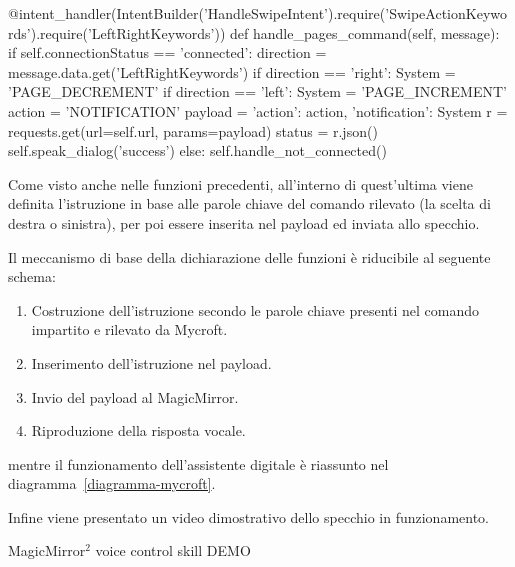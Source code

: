 \documentclass[12pt,a4paper]{article}
\begin{document}
\begin{MyVerbatim}
@intent_handler(IntentBuilder('HandleSwipeIntent').require('SwipeActionKeywords').require('LeftRightKeywords'))
def handle_pages_command(self, message):
    if self.connectionStatus == 'connected':
        direction = message.data.get('LeftRightKeywords')
        if direction == 'right':
            System = 'PAGE_DECREMENT'
        if direction == 'left':
            System = 'PAGE_INCREMENT'
        action = 'NOTIFICATION'
        payload = {'action': action, 'notification': System}
        r = requests.get(url=self.url, params=payload)
        status = r.json()
        self.speak_dialog('success')
    else:
        self.handle_not_connected()
\end{MyVerbatim}
Come visto anche nelle funzioni precedenti, all'interno di quest'ultima viene definita l'istruzione in base alle parole chiave
del comando rilevato (la scelta di destra o sinistra), per poi essere inserita nel payload ed inviata allo specchio.

Il meccanismo di base della dichiarazione delle funzioni \`e riducibile al seguente schema:
\begin{enumerate}
  \item Costruzione dell'istruzione secondo le parole chiave presenti nel comando impartito e rilevato da Mycroft.
  \item Inserimento dell'istruzione nel payload.
  \item Invio del payload al MagicMirror.
  \item Riproduzione della risposta vocale.
\end{enumerate}
mentre il funzionamento dell'assistente digitale \`e riassunto nel diagramma~\ref{diagramma-mycroft}.

Infine viene presentato un video dimostrativo dello specchio in funzionamento.

\begin{frame}{MagicMirror$^2$ voice control skill DEMO}
  \begin{center}
  \end{center}
\end{frame}
\end{document}
